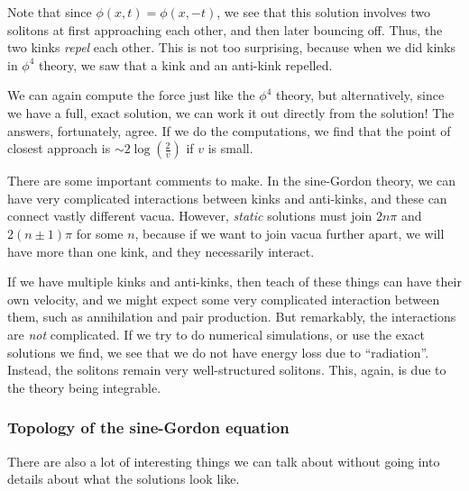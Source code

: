 \documentclass[a4paper]{article}
\begin{document}
\begin{eg}
\begin{center}
  \end{center}

  Note that since $\phi(x, t) = \phi(x, -t)$, we see that this solution involves two solitons at first approaching each other, and then later bouncing off. Thus, the two kinks \emph{repel} each other. This is not too surprising, because when we did kinks in $\phi^4$ theory, we saw that a kink and an anti-kink repelled.

  We can again compute the force just like the $\phi^4$ theory, but alternatively, since we have a full, exact solution, we can work it out directly from the solution! The answers, fortunately, agree. If we do the computations, we find that the point of closest approach is $\sim 2 \log \left(\frac{2}{v}\right)$ if $v$ is small.
\end{eg}

There are some important comments to make. In the sine-Gordon theory, we can have very complicated interactions between kinks and anti-kinks, and these can connect vastly different vacua. However, \emph{static} solutions must join $2n\pi$ and $2(n \pm 1)\pi$ for some $n$, because if we want to join vacua further apart, we will have more than one kink, and they necessarily interact.

If we have multiple kinks and anti-kinks, then teach of these things can have their own velocity, and we might expect some very complicated interaction between them, such as annihilation and pair production. But remarkably, the interactions are \emph{not} complicated. If we try to do numerical simulations, or use the exact solutions we find, we see that we do not have energy loss due to ``radiation''. Instead, the solitons remain very well-structured solitons. This, again, is due to the theory being integrable.

\subsubsection*{Topology of the sine-Gordon equation}
There are also a lot of interesting things we can talk about without going into details about what the solutions look like.
\end{document}
